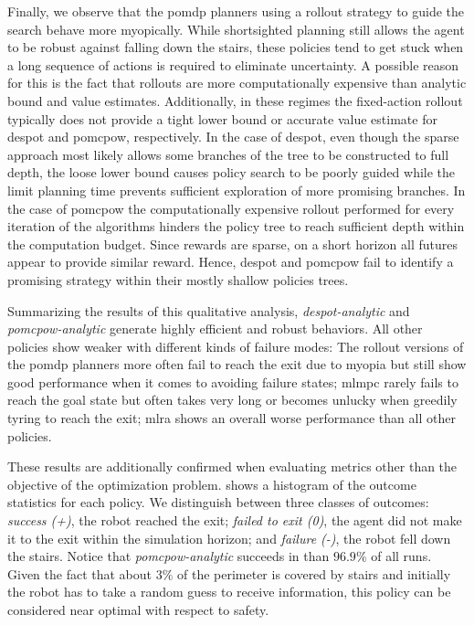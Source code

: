 Finally, we observe that the \ac{pomdp} planners using a rollout strategy to
guide the search behave more myopically. While shortsighted planning still allows
the agent to be robust against falling down the stairs, these policies tend to
get stuck when a long sequence of actions is required to eliminate uncertainty.
A possible reason for this is the fact that rollouts are more computationally
expensive than analytic bound and value estimates. Additionally, in these
regimes the fixed-action rollout typically does not provide a tight lower bound
or accurate value estimate for \ac{despot} and \ac{pomcpow}, respectively. In
the case of \ac{despot}, even though the sparse approach most likely allows
some branches of the tree to be constructed to full depth, the loose lower
bound causes policy search to be poorly guided while the limit planning time
prevents sufficient exploration of more promising branches. In the case of
\ac{pomcpow} the computationally expensive rollout performed for every iteration
of the algorithms hinders the policy tree to reach sufficient depth within
the computation budget. Since rewards are sparse, on a short horizon all
futures appear to provide similar reward. Hence, \ac{despot} and \ac{pomcpow}
fail to identify a promising strategy within their mostly shallow policies trees.


Summarizing the results of this qualitative analysis,
\emph{\ac{despot}-analytic} and \emph{\ac{pomcpow}-analytic} generate highly
efficient and robust behaviors. All other policies show weaker with different
kinds of failure modes: The rollout versions of the \ac{pomdp} planners more
often fail to reach the exit due to myopia but still show good performance when
it comes to avoiding failure states; \ac{mlmpc} rarely fails to reach the goal
state but often takes very long or becomes unlucky when greedily tyring to
reach the exit; \ac{mlra} shows an overall worse performance than all other
policies.

These results are additionally confirmed when evaluating metrics other than the
objective of the optimization problem.  shows a histogram
of the outcome statistics for each policy. We distinguish between three classes
of outcomes: \emph{success (+)}, the robot reached the exit; \emph{failed to
exit (0)}, the agent did not make it to the exit within the simulation horizon;
and \emph{failure (-)}, the robot fell down the stairs. Notice that
\emph{\ac{pomcpow}-analytic} succeeds in than $96.9\%$ of all runs. Given the
fact that about $3\%$ of the perimeter is covered by stairs and initially the
robot has to take a random guess to receive information, this policy can be
considered near optimal with respect to safety.

